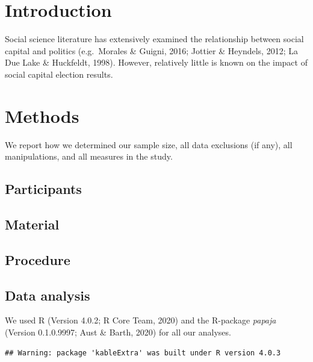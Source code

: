 \documentclass[
  english,
  man]{apa6}
\begin{document}
\hypertarget{introduction}{%
\section{Introduction}\label{introduction}}

Social science literature has extensively examined the relationship between social capital and politics (e.g.~Morales \& Guigni, 2016; Jottier \& Heyndels, 2012; La Due Lake \& Huckfeldt, 1998). However, relatively little is known on the impact of social capital election results.

\hypertarget{methods}{%
\section{Methods}\label{methods}}

We report how we determined our sample size, all data exclusions (if any), all manipulations, and all measures in the study.

\hypertarget{participants}{%
\subsection{Participants}\label{participants}}

\hypertarget{material}{%
\subsection{Material}\label{material}}

\hypertarget{procedure}{%
\subsection{Procedure}\label{procedure}}

\hypertarget{data-analysis}{%
\subsection{Data analysis}\label{data-analysis}}

We used R (Version 4.0.2; R Core Team, 2020) and the R-package \emph{papaja} (Version 0.1.0.9997; Aust \& Barth, 2020) for all our analyses.

\begin{verbatim}
## Warning: package 'kableExtra' was built under R version 4.0.3
\end{verbatim}
\end{document}
